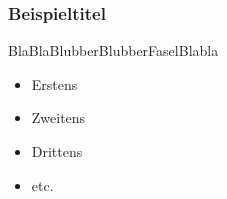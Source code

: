 \frame
{
	\frametitle{Beispieltitel}
	BlaBlaBlubberBlubberFaselBlabla
	\begin{itemize}
		\item Erstens
		\item Zweitens
		\item Drittens
		\item etc.
	\end{itemize}
}

